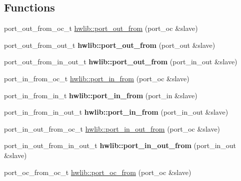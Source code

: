 \subsection*{Functions}
\textbf{ }\par
\begin{DoxyCompactItemize}
\item 
port\+\_\+out\+\_\+from\+\_\+oc\+\_\+t \hyperlink{namespacehwlib_a7ee5e8d765c714a5d0bedfa092efe4db}{hwlib\+::port\+\_\+out\+\_\+from} (port\+\_\+oc \&slave)
\item 
\mbox{\label{namespacehwlib_a242b19bea33930fa7785c2a1e85fac89}} 
port\+\_\+out\+\_\+from\+\_\+out\+\_\+t {\bfseries hwlib\+::port\+\_\+out\+\_\+from} (port\+\_\+out \&slave)
\item 
\mbox{\label{namespacehwlib_a397b263eb24e0ec088734b32375917b8}} 
port\+\_\+out\+\_\+from\+\_\+in\+\_\+out\+\_\+t {\bfseries hwlib\+::port\+\_\+out\+\_\+from} (port\+\_\+in\+\_\+out \&slave)
\end{DoxyCompactItemize}

\textbf{ }\par
\begin{DoxyCompactItemize}
\item 
port\+\_\+in\+\_\+from\+\_\+oc\+\_\+t \hyperlink{namespacehwlib_a886e9f3e453056786f7329bfdc587d7b}{hwlib\+::port\+\_\+in\+\_\+from} (port\+\_\+oc \&slave)
\item 
\mbox{\label{namespacehwlib_a6e7e586b6cd303801bfe5e4a794f02d5}} 
port\+\_\+in\+\_\+from\+\_\+in\+\_\+t {\bfseries hwlib\+::port\+\_\+in\+\_\+from} (port\+\_\+in \&slave)
\item 
\mbox{\label{namespacehwlib_ae5a7acfd4ed72e41bcbfbf1910068aa2}} 
port\+\_\+in\+\_\+from\+\_\+in\+\_\+out\+\_\+t {\bfseries hwlib\+::port\+\_\+in\+\_\+from} (port\+\_\+in\+\_\+out \&slave)
\end{DoxyCompactItemize}

\textbf{ }\par
\begin{DoxyCompactItemize}
\item 
port\+\_\+in\+\_\+out\+\_\+from\+\_\+oc\+\_\+t \hyperlink{namespacehwlib_acbdd725ccffcd89167303457d733ecc0}{hwlib\+::port\+\_\+in\+\_\+out\+\_\+from} (port\+\_\+oc \&slave)
\item 
\mbox{\label{namespacehwlib_a1d4aba6bf66bf7c1d5e992bf9175a866}} 
port\+\_\+in\+\_\+out\+\_\+from\+\_\+in\+\_\+out\+\_\+t {\bfseries hwlib\+::port\+\_\+in\+\_\+out\+\_\+from} (port\+\_\+in\+\_\+out \&slave)
\end{DoxyCompactItemize}

\textbf{ }\par
\begin{DoxyCompactItemize}
\item 
port\+\_\+oc\+\_\+from\+\_\+oc\+\_\+t \hyperlink{namespacehwlib_a29cc3710580f0fbeeb39dffe530bd007}{hwlib\+::port\+\_\+oc\+\_\+from} (port\+\_\+oc \&slave)
\end{DoxyCompactItemize}

